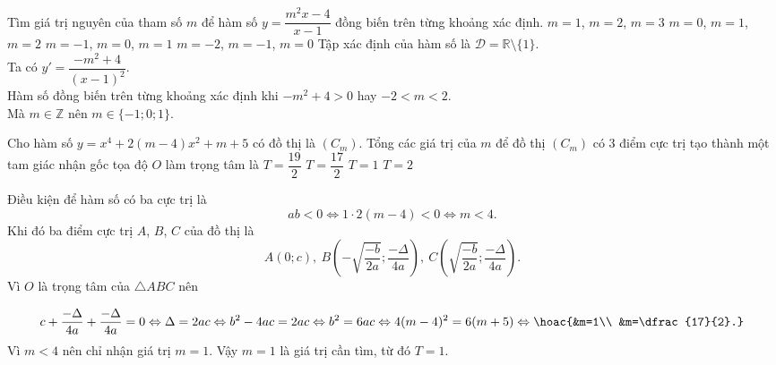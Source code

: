 \begin{ex}%
 Tìm giá trị nguyên của tham số $m$ để hàm số $y=\dfrac{m^2x-4}{x-1}$ đồng biến trên từng khoảng xác định.
 \choice
  {$m=1$, $m=2$, $m=3$}
  {$m=0$, $m=1$, $m=2$}
  {\True $m=-1$, $m=0$, $m=1$}
  {$m=-2$, $m=-1$, $m=0$}
 \loigiai
  {
  Tập xác định của hàm số là $\mathscr{D}=\mathbb{R}\setminus\{1\}$.\\
  Ta có $y'=\dfrac{-m^2+4}{(x-1)^2}$.\\
  Hàm số đồng biến trên từng khoảng xác định khi $-m^2+4>0$ hay $-2<m<2$.\\
  Mà $m\in \mathbb{Z}$ nên $m\in \{-1;0;1\}$.
  }
\end{ex}

\begin{ex}%
 Cho hàm số $y=x^4+2(m-4)x^2+m+5$ có đồ thị là $(C_m)$. Tổng các giá trị của $m$ để đồ thị $(C_m)$ có $3$ điểm cực trị tạo thành một tam giác nhận gốc tọa độ $O$ làm trọng tâm là
 \choice
  {$T=\dfrac{19}{2}$}
  {$T=\dfrac{17}{2}$}
  {\True $T=1$}
  {$T=2$}
 \loigiai
  {
  \immini
  {
  Điều kiện để hàm số có ba cực trị là 
  \[ab<0\Leftrightarrow 1\cdot 2(m-4)<0\Leftrightarrow m<4.\]
  Khi đó ba điểm cực trị $A$, $B$, $C$ của đồ thị là 
  \[A\left(0;c\right),\ B\left(-\sqrt{\dfrac{-b}{2a}};\dfrac{-\Delta}{4a}\right),\ C\left(\sqrt{\dfrac{-b}{2a}};\dfrac{-\Delta}{4a}\right).\]
  Vì $O$ là trọng tâm của $\triangle ABC$ nên
  }
  {
  }
  \noindent
  \[c+\dfrac{-\Delta}{4a}+\dfrac{-\Delta}{4a}=0\Leftrightarrow \Delta=2ac\Leftrightarrow b^2-4ac=2ac\Leftrightarrow b^2=6ac\Leftrightarrow 4(m-4)^2=6(m+5)\Leftrightarrow \hoac{&m=1\\ &m=\dfrac{17}{2}.}\]
  Vì $m<4$ nên chỉ nhận giá trị $m=1$. Vậy $m=1$ là giá trị cần tìm, từ đó $T=1$.
  }
\end{ex}

